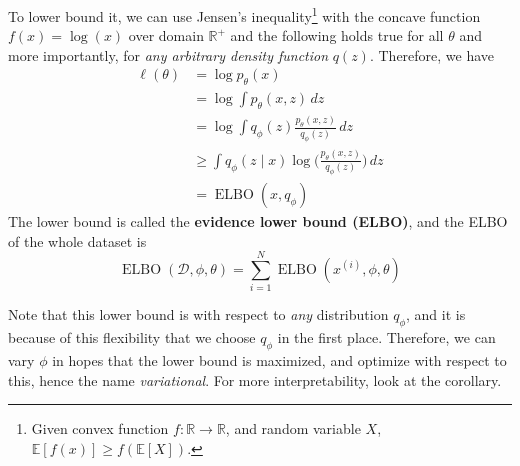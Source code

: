 \documentclass{article}
\DeclareMathOperator{\elbo}{ELBO}
\begin{document}
  \begin{definition}
    To lower bound it, we can use Jensen's inequality\footnote{Given convex function $f: \mathbb{R} \rightarrow \mathbb{R}$, and random variable $X$, $\mathbb{E}[f(x)] \geq f(\mathbb{E}[X])$.} with the concave function $f(x) = \log(x)$ over domain $\mathbb{R}^+$ and the following holds true for all $\theta$ and more importantly, for \textit{any arbitrary density function} $q(z)$. Therefore, we have 
    \begin{align}
      \ell(\theta) & = \log p_\theta (x) \\
                   & = \log \int p_\theta (x, z) \,dz \\
                   & = \log \int q_\phi (z) \frac{p_\theta (x, z)}{q_\phi (z)} \,dz \\ 
                   & \geq \int q_\phi (z \mid x) \log \bigg( \frac{p_\theta (x, z)}{q_\phi (z)} \bigg) \,dz \\  
                   & = \elbo(x, q_\phi)
    \end{align}
    The lower bound is called the \textbf{evidence lower bound (ELBO)}, and the ELBO of the whole dataset is 
    \begin{equation}
      \elbo(\mathcal{D}, \phi, \theta) = \sum_{i=1}^N \elbo(x^{(i)}, \phi, \theta)
    \end{equation}
  \end{definition} 

  Note that this lower bound is with respect to \textit{any} distribution $q_\phi$, and it is because of this flexibility that we choose $q_\phi$ in the first place. Therefore, we can vary $\phi$ in hopes that the lower bound is maximized, and optimize with respect to this, hence the name \textit{variational}. For more interpretability, look at the corollary. 
\end{document}
